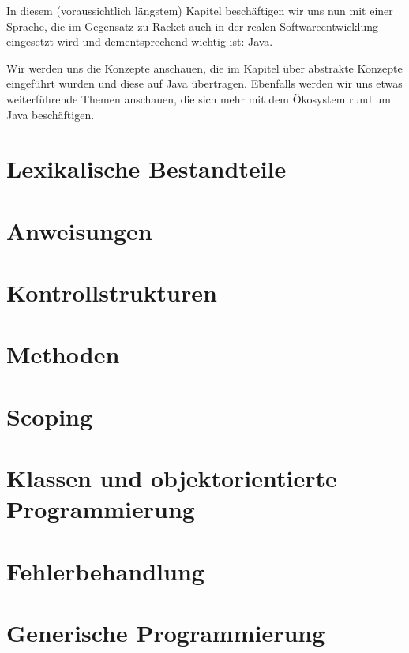 In diesem (voraussichtlich längstem) Kapitel beschäftigen wir uns nun mit einer Sprache, die im Gegensatz zu Racket auch in der realen Softwareentwicklung eingesetzt wird und dementsprechend wichtig ist: Java.

Wir werden uns die Konzepte anschauen, die im Kapitel über abstrakte Konzepte eingeführt wurden und diese auf Java übertragen. Ebenfalls werden wir uns etwas weiterführende Themen anschauen, die sich mehr mit dem Ökosystem rund um Java beschäftigen. 

\section{Lexikalische Bestandteile}
	

\section{Anweisungen}
	

\section{Kontrollstrukturen}
	

\section{Methoden}
	

\section{Scoping}
	

\section{Klassen und objektorientierte Programmierung}
	

\section{Fehlerbehandlung}
	

\section{Generische Programmierung}
	


